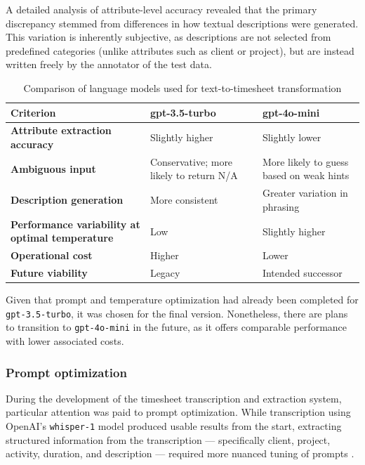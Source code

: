 \documentclass[
  digital,     %
  oneside,     %
  nosansbold,  %
  nocolorbold, %
  lof,         %
  lot,         %
]{fithesis4}
\begin{document}
A detailed analysis of attribute-level accuracy revealed that the primary discrepancy stemmed from differences in how textual descriptions were generated. This variation is inherently subjective, as descriptions are not selected from predefined categories (unlike attributes such as client or project), but are instead written freely by the annotator of the test data.

\begin{table}[H]
\centering
\begin{tabularx}{\textwidth}{|X|X|X|}
\hline
\textbf{Criterion} & \textbf{gpt-3.5-turbo} & \textbf{gpt-4o-mini} \\
\hline
\textbf{Attribute extraction accuracy} & Slightly higher & Slightly lower \\
\hline
\textbf{Ambiguous input} & Conservative; more likely to return \gls{N/A} & More likely to guess based on weak hints \\
\hline
\textbf{Description generation} & More consistent & Greater variation in phrasing \\
\hline
\textbf{Performance variability at optimal temperature} & Low & Slightly higher \\
\hline
\textbf{Operational cost} & Higher & Lower \\
\hline
\textbf{Future viability} & Legacy & Intended successor \\
\hline
\end{tabularx}
\caption{Comparison of language models used for text-to-timesheet transformation}
\label{tab:text_to_timesheet_models}
\end{table}

Given that prompt and temperature optimization had already been completed for \texttt{gpt-3.5-turbo}, it was chosen for the final version. Nonetheless, there are plans to transition to \texttt{gpt-4o-mini} in the future, as it offers comparable performance with lower associated costs.

\subsubsection{Prompt optimization}

During the development of the timesheet transcription and extraction system, particular attention was paid to prompt optimization. While transcription using OpenAI's \texttt{whisper-1} model produced usable results from the start, extracting structured information from the transcription — specifically client, project, activity, duration, and description — required more nuanced tuning of prompts \cite{openaiPrompt}.
\end{document}
